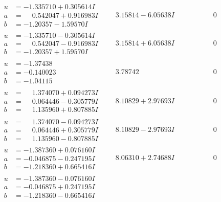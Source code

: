 \documentclass[1p]{elsarticle_modified}
\theoremstyle{definition}
\begin{document}
$$\begin{array}{c|c|c}
\begin{aligned}
u &= -1.335710 + 0.305614 I \\
a &= \phantom{-}0.542047 + 0.916983 I \\
b &= -1.20357 - 1.59570 I\end{aligned}
 & \phantom{-}3.15814 - 6.05638 I & \phantom{-0.000000 } 0 \\ \hline\begin{aligned}
u &= -1.335710 - 0.305614 I \\
a &= \phantom{-}0.542047 - 0.916983 I \\
b &= -1.20357 + 1.59570 I\end{aligned}
 & \phantom{-}3.15814 + 6.05638 I & \phantom{-0.000000 } 0 \\ \hline\begin{aligned}
u &= -1.37438\phantom{ +0.000000I} \\
a &= -0.140023\phantom{ +0.000000I} \\
b &= -1.04115\phantom{ +0.000000I}\end{aligned}
 & \phantom{-}3.78742\phantom{ +0.000000I} & \phantom{-0.000000 } 0 \\ \hline\begin{aligned}
u &= \phantom{-}1.374070 + 0.094273 I \\
a &= \phantom{-}0.064446 - 0.305779 I \\
b &= \phantom{-}1.135960 + 0.807885 I\end{aligned}
 & \phantom{-}8.10829 + 2.97693 I & \phantom{-0.000000 } 0 \\ \hline\begin{aligned}
u &= \phantom{-}1.374070 - 0.094273 I \\
a &= \phantom{-}0.064446 + 0.305779 I \\
b &= \phantom{-}1.135960 - 0.807885 I\end{aligned}
 & \phantom{-}8.10829 - 2.97693 I & \phantom{-0.000000 } 0 \\ \hline\begin{aligned}
u &= -1.387360 + 0.076160 I \\
a &= -0.046875 - 0.247195 I \\
b &= -1.218360 + 0.665416 I\end{aligned}
 & \phantom{-}8.06310 + 2.74688 I & \phantom{-0.000000 } 0 \\ \hline\begin{aligned}
u &= -1.387360 - 0.076160 I \\
a &= -0.046875 + 0.247195 I \\
b &= -1.218360 - 0.665416 I\end{aligned}

\end{array}$$
\end{document}

